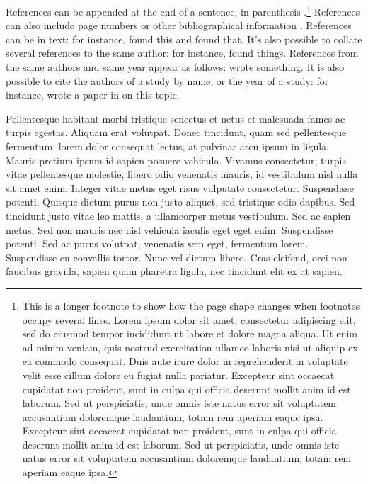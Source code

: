 References can be appended at the end of a sentence, in parenthesis \citep{MS15}.\footnote{This is a longer footnote to show how the page shape changes when footnotes occupy several lines. Lorem ipsum dolor sit amet, consectetur adipiscing elit, sed do eiusmod tempor incididunt ut labore et dolore magna aliqua. Ut enim ad minim veniam, quis nostrud exercitation ullamco laboris nisi ut aliquip ex ea commodo consequat. Duis aute irure dolor in reprehenderit in voluptate velit esse cillum dolore eu fugiat nulla pariatur. Excepteur sint occaecat cupidatat non proident, sunt in culpa qui officia deserunt mollit anim id est laborum. Sed ut perspiciatis, unde omnis iste natus error sit voluptatem accusantium doloremque laudantium, totam rem aperiam eaque ipsa. Excepteur sint occaecat cupidatat non proident, sunt in culpa qui officia deserunt mollit anim id est laborum. Sed ut perspiciatis, unde omnis iste natus error sit voluptatem accusantium doloremque laudantium, totam rem aperiam eaque ipsa.} References can also include page numbers or other bibliographical information \citep[p. 1305]{MS19}.  References can be in text: for instance, \citet{M12} found this and \citet[figure 1]{M14} found that. It's also possible to collate several references to the same author: for instance, \citet{M12,M14} found things. References from the same authors and same year appear as follows: \citet{LMS18a,LMS18b} wrote something. It is also possible to cite the authors of a study by name, or the year of a study: for instance, \citeauthor{EMM21} wrote a paper in \citeyear{EMM21} on this topic.

Pellentesque habitant morbi tristique senectus et netus et malesuada fames ac turpis egestas. Aliquam erat volutpat. Donec tincidunt, quam sed pellentesque fermentum, lorem dolor consequat lectus, at pulvinar arcu ipsum in ligula. Mauris pretium ipsum id sapien posuere vehicula. Vivamus consectetur, turpis vitae pellentesque molestie, libero odio venenatis mauris, id vestibulum nisl nulla sit amet enim. Integer vitae metus eget risus vulputate consectetur. Suspendisse potenti. Quisque dictum purus non justo aliquet, sed tristique odio dapibus. Sed tincidunt justo vitae leo mattis, a ullamcorper metus vestibulum. Sed ac sapien metus. Sed non mauris nec nisl vehicula iaculis eget eget enim. Suspendisse potenti. Sed ac purus volutpat, venenatis sem eget, fermentum lorem. Suspendisse eu convallis tortor. Nunc vel dictum libero. Cras eleifend, orci non faucibus gravida, sapien quam pharetra ligula, nec tincidunt elit ex at sapien.

